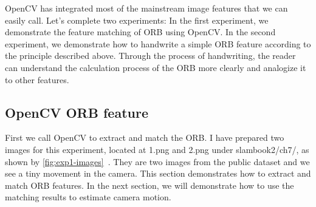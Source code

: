 OpenCV has integrated most of the mainstream image features that we can easily call. Let's complete two experiments: In the first experiment, we demonstrate the feature matching of ORB using OpenCV. In the second experiment, we demonstrate how to handwrite a simple ORB feature according to the principle described above. Through the process of handwriting, the reader can understand the calculation process of the ORB more clearly and analogize it to other features.
\subsection{OpenCV ORB feature}
First we call OpenCV to extract and match the ORB. I have prepared two images for this experiment, located at 1.png and 2.png under slambook2/ch7/, as shown by \autoref{fig:exp1-images}~. They are two images from the public dataset \cite{Sturm2012} and we see a tiny movement in the camera. This section demonstrates how to extract and match ORB features. In the next section, we will demonstrate how to use the matching results to estimate camera motion.

